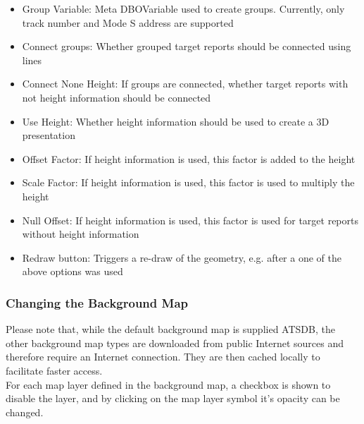\begin{itemize}
 \item Group Variable: Meta DBOVariable used to create groups. Currently, only track number and Mode S address are supported
 \item Connect groups: Whether grouped target reports should be connected using lines
 \item Connect None Height: If groups are connected, whether target reports with not height information should be connected
 \item Use Height: Whether height information should be used to create a 3D presentation
 \item Offset Factor: If height information is used, this factor is added to the height
 \item Scale Factor: If height information is used, this factor is used to multiply the height
 \item Null Offset: If height information is used, this factor is used for target reports without height information
 \item Redraw button: Triggers a re-draw of the geometry, e.g. after a one of the above options was used
\end{itemize}

\subsubsection{Changing the Background Map}

Please note that, while the default background map is supplied ATSDB, the other background map types are downloaded from public Internet sources and therefore require an Internet connection. They are then cached locally to facilitate faster access. \\

For each map layer defined in the background map, a checkbox is shown to disable the layer, and by clicking on the map layer symbol it's opacity can be changed.

